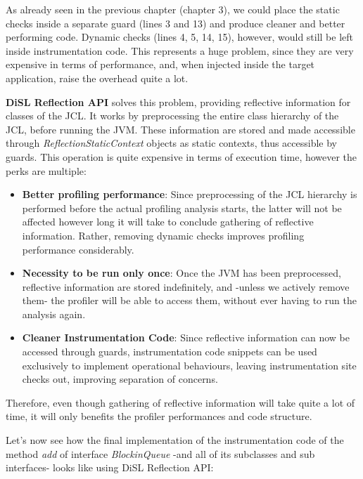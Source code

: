 \documentclass[]{usiinfthesis}
\begin{document}
\noindent
As already seen in the previous chapter (chapter 3), we could place the static checks inside a separate guard (lines 3 and 13) and produce cleaner and better performing code. Dynamic checks (lines 4, 5, 14, 15), however, would still be left inside instrumentation code. This represents a huge problem, since they are very expensive in terms of performance, and, when injected inside the target application, raise the overhead quite a lot.

\noindent
\textbf{DiSL Reflection API} solves this problem, providing reflective information for classes of the JCL. It works by preprocessing the entire class hierarchy of the JCL, before running the JVM. These information are stored and made accessible through \textit{ReflectionStaticContext} objects as static contexts, thus accessible by guards. This operation is quite expensive in terms of execution time, however the perks are multiple:
\begin{itemize}
    \item \textbf{Better profiling performance}: Since preprocessing of the JCL hierarchy is performed before the actual profiling analysis starts, the latter will not be affected however long it will take to conclude gathering of reflective information. Rather, removing dynamic checks improves profiling performance considerably.
    \item \textbf{Necessity to be run only once}: Once the JVM has been preprocessed, reflective information are stored indefinitely, and -unless we actively remove them- the profiler will be able to access them, without ever having to run the analysis again.
    \item \textbf{Cleaner Instrumentation Code}: Since reflective information can now be accessed through guards, instrumentation code snippets can be used exclusively to implement operational behaviours, leaving instrumentation site checks out, improving separation of concerns.
\end{itemize}
Therefore, even though gathering of reflective information will take quite a lot of time, it will only benefits the profiler performances and code structure. 

\vspace*{0.5cm}
\noindent
Let's now see how the final implementation of the instrumentation code of the method \textit{add} of interface \textit{BlockinQueue} -and all of its subclasses and sub interfaces- looks like using DiSL Reflection API:
\end{document}
